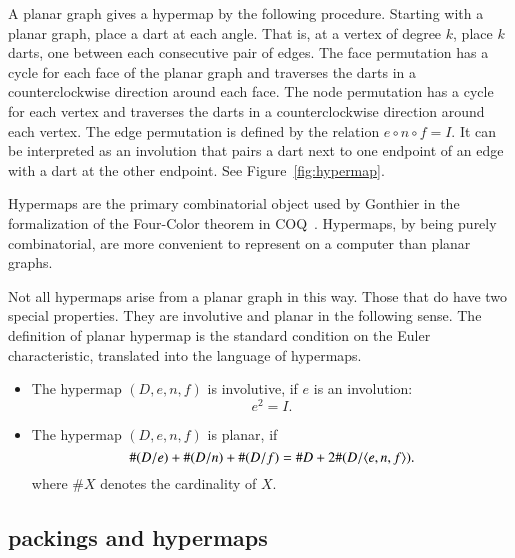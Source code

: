 A planar graph gives  a hypermap
by the following procedure.  Starting with a planar graph,
place a dart at each angle.  That is, at a vertex of degree $k$,
place $k$ darts, one between each consecutive pair of edges.
The face permutation has a cycle for
each face of the planar graph and  traverses the
darts in a counterclockwise direction around each face.
The node permutation has a cycle for each vertex and traverses
the darts in a counterclockwise direction around each vertex.
The edge permutation is defined by the relation $e\circ n\circ f=I$.
It can be interpreted as an involution that pairs a dart next
to one endpoint of an edge with a dart at the other endpoint.
See Figure~\ref{fig:hypermap}.

\begin{floatingfigure}{80mm}
  \begin{center}
   \end{center}
  \caption{}
\label{fig:hypermap}
\end{floatingfigure}

Hypermaps are the primary combinatorial object used by Gonthier
in the formalization of the Four-Color theorem in COQ~\cite{Gon}.
Hypermaps, by being purely combinatorial, are more convenient
to represent on a computer than planar graphs.  


Not all hypermaps arise from a planar graph in this way.
Those that do have two special properties.  They are involutive
and planar in the following sense.   The definition
of planar hypermap is the standard condition on the Euler
characteristic, translated into the language of hypermaps.

\begin{definition}\label{def:involutive}
\mbox{}
\begin{itemize}
\item The hypermap $(D,e,n,f)$ is involutive, if $e$ is an involution:
$$
 e^2 = I.
$$
\item The hypermap $(D,e,n,f)$ is planar, if
   $$
   \#(D/e) + \#(D/n) + \#(D/f) = \# D + 2\#(D/\langle e,n,f\rangle).
   $$
where $\# X$ denotes the cardinality of $X$.
\end{itemize}
\end{definition}

\subsection{packings and hypermaps}\label{sec:ph}

